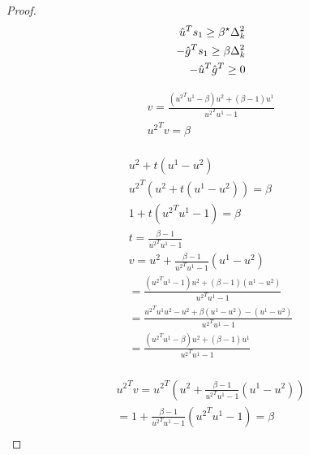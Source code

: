 \begin{proof}
\begin{align*}
\hat u^T s_1 \ge \beta^{\star} \Delta_k^2  \\
-\hat g^T s_1 \ge \beta \Delta_k^2 \\
-\hat u^T\hat g^T \ge 0
\end{align*}













































\vspace{20cm}
\begin{align*}
v = \frac{({u^2}^Tu^1 - \beta )u^2 +(\beta- 1)u^1 }{{u^2}^Tu^1 - 1} \\
{u^2}^Tv = \beta \\
\end{align*}


\begin{align*}
u^2 + t (u^1 - u^2) \\
{u^2}^T\left(u^2 + t (u^1 - u^2)\right) = \beta\\
1 + t ({u^2}^Tu^1 - 1) = \beta\\
t = \frac{\beta - 1}{{u^2}^Tu^1 - 1}\\
v = u^2 + \frac{\beta - 1}{{u^2}^Tu^1 - 1} (u^1 - u^2) \\
= \frac{({u^2}^Tu^1 - 1)u^2 + (\beta - 1)(u^1 - u^2) }{{u^2}^Tu^1 - 1} \\
= \frac{{u^2}^Tu^1u^2 - u^2 + \beta(u^1 - u^2) - (u^1 - u^2) }{{u^2}^Tu^1 - 1} \\
= \frac{({u^2}^Tu^1 - \beta )u^2 +(\beta- 1)u^1 }{{u^2}^Tu^1 - 1} \\
\end{align*}

\begin{align*}
{u^2}^Tv = {u^2}^T(u^2 + \frac{\beta - 1}{{u^2}^Tu^1 - 1} (u^1 - u^2)) \\
=1 + \frac{\beta - 1}{{u^2}^Tu^1 - 1} ({u^2}^Tu^1 - 1) = \beta \\
\end{align*}



\end{proof}
